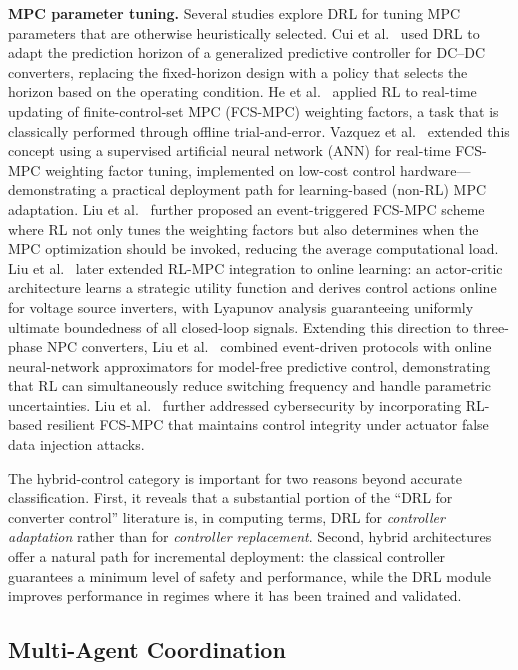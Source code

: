 \documentclass[manuscript,screen,review]{acmart}
\begin{document}
\textbf{MPC parameter tuning.}
Several studies explore DRL for tuning MPC parameters that are otherwise heuristically selected.
Cui et al.~\cite{cui2023adaptive} used DRL to adapt the prediction horizon of a generalized predictive controller for DC--DC converters, replacing the fixed-horizon design with a policy that selects the horizon based on the operating condition.
He et al.~\cite{he2021weighting} applied RL to real-time updating of finite-control-set MPC (FCS-MPC) weighting factors, a task that is classically performed through offline trial-and-error.
Vazquez et al.~\cite{vazquez2022artificial} extended this concept using a supervised artificial neural network (ANN) for real-time FCS-MPC weighting factor tuning, implemented on low-cost control hardware---demonstrating a practical deployment path for learning-based (non-RL) MPC adaptation.
Liu et al.~\cite{liu2023reinforcement} further proposed an event-triggered FCS-MPC scheme where RL not only tunes the weighting factors but also determines when the MPC optimization should be invoked, reducing the average computational load.
Liu et al.~\cite{liu2024predictive} later extended RL-MPC integration to online learning: an actor-critic architecture learns a strategic utility function and derives control actions online for voltage source inverters, with Lyapunov analysis guaranteeing uniformly ultimate boundedness of all closed-loop signals.
Extending this direction to three-phase NPC converters, Liu et al.~\cite{liu2024event} combined event-driven protocols with online neural-network approximators for model-free predictive control, demonstrating that RL can simultaneously reduce switching frequency and handle parametric uncertainties.
Liu et al.~\cite{liu2024learning} further addressed cybersecurity by incorporating RL-based resilient FCS-MPC that maintains control integrity under actuator false data injection attacks.

The hybrid-control category is important for two reasons beyond accurate classification.
First, it reveals that a substantial portion of the ``DRL for converter control'' literature is, in computing terms, DRL for \emph{controller adaptation} rather than for \emph{controller replacement}.
Second, hybrid architectures offer a natural path for incremental deployment: the classical controller guarantees a minimum level of safety and performance, while the DRL module improves performance in regimes where it has been trained and validated.

\subsection{Multi-Agent Coordination}
\end{document}
